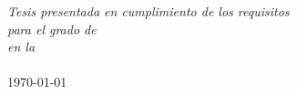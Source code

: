 \documentclass[
12pt, %
spanish,
singlespacing, %
headsepline, %
]{MastersDoctoralThesis} %
\begin{document}
\begin{titlepage}
\begin{center}
\large \textit{Tesis presentada en cumplimiento de los requisitos\\ para el grado de \degreename}\\[0.3cm] %
\textit{en la}\\[0.4cm]
\deptname\\[2cm] %
 
\vspace*{-1cm}
{\large \today}\\[4cm] %
 
\vfill
\end{center}
\end{titlepage}


\begin{declaration}

 
 
\end{declaration}
\end{document}
